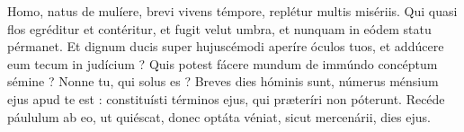 
Homo, natus de mulíere, brevi vivens témpore, replétur multis misériis.
Qui quasi flos egréditur et contéritur, et fugit velut umbra, et nunquam in eódem statu pérmanet.
Et dignum ducis super hujuscémodi aperíre óculos tuos, et addúcere eum tecum in judícium ?
Quis potest fácere mundum de immúndo concéptum sémine ? Nonne tu, qui solus es ?
Breves dies hóminis sunt, númerus ménsium ejus apud te est : constituísti términos ejus, qui præteríri non póterunt.
Recéde páululum ab eo, ut quiéscat, donec optáta véniat, sicut mercenárii, dies ejus.